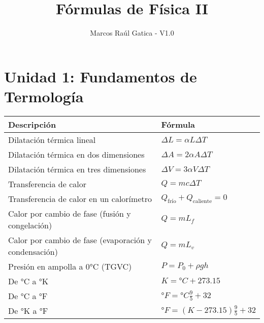 \documentclass[a4paper,12pt]{article}
\title{Fórmulas de Física II}
\author{Marcos Raúl Gatica - V1.0}
\date{}
\begin{document}
	
	\maketitle
	\thispagestyle{fancy}
	\tableofcontents
	\newpage
	
	\section{Unidad 1: Fundamentos de Termología}
	\renewcommand{\arraystretch}{1.5} 
	\begin{center}
		\begin{tabularx}{\textwidth}{|X|X|}
			\hline
			\textbf{Descripción} & \textbf{Fórmula} \\ \hline
			Dilatación térmica lineal & $\Delta L = \alpha L \Delta T$ \\ \hline
			Dilatación térmica en dos dimensiones & $\Delta A = 2\alpha A \Delta T$ \\ \hline
			Dilatación térmica en tres dimensiones & $\Delta V = 3 \alpha V \Delta T$ \\ \hline
			Transferencia de calor & $Q = mc \Delta T$ \\ \hline
			Transferencia de calor en un calorímetro & $Q_{\text{frío}} + Q_{\text{caliente}} = 0$ \\ \hline
			Calor por cambio de fase (fusión y congelación) & $Q = mL_f$ \\ \hline
			Calor por cambio de fase (evaporación y condensación) & $Q = mL_v$ \\ \hline
			Presión en ampolla a 0°C (TGVC) & $P = {P_0} + \rho g h$ \\ \hline
			De °C a °K & $K = °C + 273.15$ \\ \hline
			De °C a °F & $°F = °C \frac{9}{5} + 32$ \\ \hline
			De °K a °F & $°F = (K - 273.15) \frac{9}{5} + 32$ \\ \hline
		\end{tabularx}
	\end{center}
	
\end{document}
